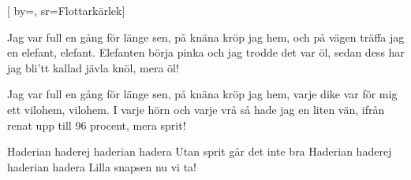 


[ 	%
	by={},	%
	sr={Flottarkärlek}]		%
	
\beginverse*		%
Jag var full en gång för länge sen,
på knäna kröp jag hem,
och på vägen träffa jag en elefant, elefant.
Elefanten börja pinka och jag trodde det var öl,
sedan dess har jag bli'tt kallad
jävla knöl, mera öl!
\endverse			%

\beginverse*		%
Jag var full en gång för länge sen,
på knäna kröp jag hem,
varje dike var för mig ett vilohem, vilohem.
I varje hörn och varje vrå så hade jag en liten vän,
ifrån renat upp till 96 procent, mera sprit!
\endverse			%

\beginverse*		%
Haderian haderej haderian hadera
Utan sprit går det inte bra
Haderian haderej haderian hadera
Lilla snapsen nu vi ta!
\endverse			%
\endsong			%
